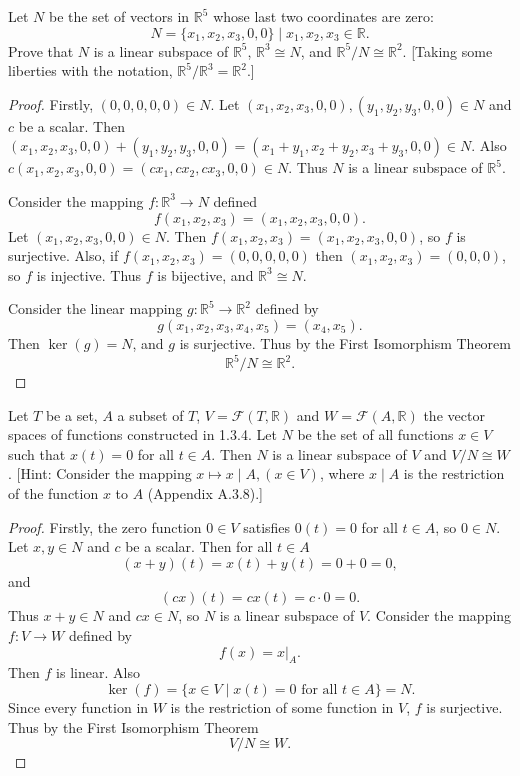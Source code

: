 \begin{tcolorbox}[title=Problem 5, breakable]
    Let $N$ be the set of vectors in $\mathbb{R}^5$ whose last two coordinates are zero:
    \[N = \{x_1, x_2, x_3, 0, 0\} \mid x_1, x_2, x_3 \in \mathbb{R}.\]
    Prove that $N$ is a linear subspace of $\mathbb{R}^5$, $\mathbb{R}^3 \cong N$, 
        and $\mathbb{R}^5 / N \cong \mathbb{R}^2$.
    [Taking some liberties with the notation, $\mathbb{R}^5 / \mathbb{R}^3 = \mathbb{R}^2$.]
\end{tcolorbox}

\begin{proof}
    Firstly, $(0, 0, 0, 0, 0) \in N$.
    Let $(x_1, x_2, x_3, 0, 0), (y_1, y_2, y_3, 0, 0) \in N$ and $c$ be a scalar.
    Then $(x_1, x_2, x_3, 0, 0) + (y_1, y_2, y_3, 0, 0) = (x_1 + y_1, x_2 + y_2, x_3 + y_3, 0, 0) \in N$.
    Also $c(x_1, x_2, x_3, 0, 0) = (c x_1, c x_2, c x_3, 0, 0) \in N$.
    Thus $N$ is a linear subspace of $\mathbb{R}^5$.

    Consider the mapping $f : \mathbb{R}^3 \longrightarrow N$ defined 
    \[
        f(x_1, x_2, x_3) = (x_1, x_2, x_3, 0, 0).
    \]
    Let $(x_1, x_2, x_3, 0, 0) \in N$. Then $f(x_1, x_2, x_3) = (x_1, x_2, x_3, 0, 0)$, so $f$ is surjective.
    Also, if $f(x_1, x_2, x_3) = (0, 0, 0, 0, 0)$ then $(x_1, x_2, x_3) = (0, 0, 0)$, so $f$ is injective.
    Thus $f$ is bijective, and $\mathbb{R}^3 \cong N$.

    Consider the linear mapping $g : \mathbb{R}^5 \to \mathbb{R}^2$ defined by
    \[
        g(x_1, x_2, x_3, x_4, x_5) = (x_4, x_5).
    \]
    Then $\ker(g) = N$, and $g$ is surjective. Thus by the First Isomorphism Theorem
    \[
        \mathbb{R}^5 / N \cong \mathbb{R}^2.
    \]
\end{proof}

\begin{tcolorbox}[title=Problem 6, breakable]
    Let $T$ be a set, $A$ a subset of $T$, $V = \mathcal{F}(T, \mathbb{R})$ and $W = \mathcal{F}(A, \mathbb{R})$
        the vector spaces of functions constructed in 1.3.4. Let $N$ be the set of all functions $x \in V$
        such that $x(t) = 0$ for all $t \in A$. Then $N$ is a linear subspace of $V$ and $V / N \cong W$.
    [Hint: Consider the mapping $x \mapsto x \mid A, (x \in V)$, where $x \mid A$ is the restriction 
    of the function $x$ to $A$ (Appendix A.3.8).]
\end{tcolorbox}

\begin{proof}
    Firstly, the zero function $0 \in V$ satisfies $0(t) = 0$ for all $t \in A$, so $0 \in N$.
    Let $x, y \in N$ and $c$ be a scalar. Then for all $t \in A$
    \[
        (x + y)(t) = x(t) + y(t) = 0 + 0 = 0,
    \]
    and
    \[
        (cx)(t) = c x(t) = c \cdot 0 = 0.
    \]
    Thus $x + y \in N$ and $cx \in N$, so $N$ is a linear subspace of $V$.
    Consider the mapping $f : V \to W$ defined by
    \[
        f(x) = x|_A.
    \]
    Then $f$ is linear. Also
    \[
        \ker(f) = \{x \in V \mid x(t) = 0 \text{ for all } t \in A\} = N.
    \]
    Since every function in $W$ is the restriction of some function in $V$, $f$ is surjective.
    Thus by the First Isomorphism Theorem
    \[
        V/N \cong W.
    \]
\end{proof}